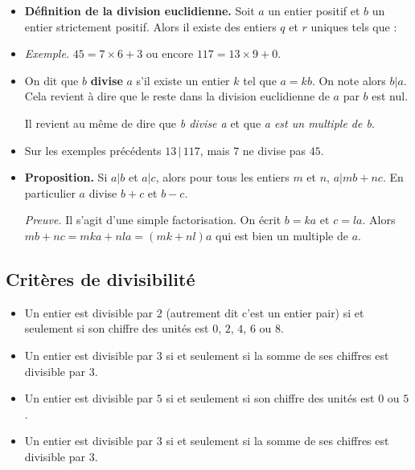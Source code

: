 \documentclass[11pt,class=report,crop=false]{standalone}
\begin{document}
\begin{itemize}
    \item \textbf{Définition de la division euclidienne.}
    Soit $a$ un entier positif et $b$ un entier strictement positif. Alors il existe des entiers $q$ et $r$ uniques tels que : 
    
    \item \emph{Exemple.} $45 = 7 \times 6 + 3$ \qquad ou encore \qquad $117 = 13 \times 9 + 0$.
    
    \item On dit que $b$ \textbf{divise} $a$ s'il existe un entier $k$ tel que $a = kb$. On note alors $b | a$. Cela revient à dire que le reste dans la division euclidienne de $a$ par $b$ est nul.
    
    Il revient au même de dire que \textit{b divise a} et que \textit{a est un multiple de b}.
    
    \item Sur les exemples précédents $13\, | \, 117$, mais $7$ ne divise pas $45$.
    
    \item \textbf{Proposition.} Si $a|b$ et $a|c$, alors pour tous les entiers $m$ et $n$, $a|mb+nc$. En particulier $a$ divise $b+c$ et $b-c$.
    
    \emph{Preuve.} Il s'agit d'une simple factorisation. On écrit $b=ka$ et $c=la$. Alors $mb+nc = mka+nla=(mk+nl)a$ qui est bien un multiple de $a$.
    
    
\end{itemize}

\subsection*{Critères de divisibilité}

\begin{itemize}
    \item Un entier est divisible par $2$ (autrement dit c'est un entier pair) si et seulement si son chiffre des unités est $0$, $2$, $4$, $6$ ou $8$.
    
    \item Un entier est divisible par $3$  si et seulement si la somme de ses chiffres est divisible par $3$.
       
    \item Un entier est divisible par $5$ si et seulement si son chiffre des unités est $0$ ou $5$.
    
    \item Un entier est divisible par $3$  si et seulement si la somme de ses chiffres est divisible par $3$.      
\end{itemize}
\end{document}
